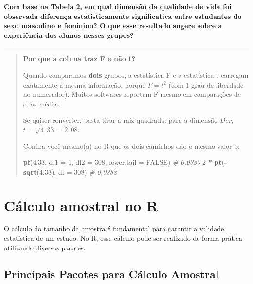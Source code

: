 \documentclass[
]{book}
\newenvironment{Shaded}{\begin{snugshade}}{\end{snugshade}}
\newcommand{\AttributeTok}[1]{\textcolor[rgb]{0.13,0.29,0.53}{#1}}
\newcommand{\CommentTok}[1]{\textcolor[rgb]{0.56,0.35,0.01}{\textit{#1}}}
\newcommand{\ConstantTok}[1]{\textcolor[rgb]{0.56,0.35,0.01}{#1}}
\newcommand{\DecValTok}[1]{\textcolor[rgb]{0.00,0.00,0.81}{#1}}
\newcommand{\FloatTok}[1]{\textcolor[rgb]{0.00,0.00,0.81}{#1}}
\newcommand{\FunctionTok}[1]{\textcolor[rgb]{0.13,0.29,0.53}{\textbf{#1}}}
\newcommand{\NormalTok}[1]{#1}
\newcommand{\SpecialCharTok}[1]{\textcolor[rgb]{0.81,0.36,0.00}{\textbf{#1}}}
\begin{document}
\textbf{Com base na Tabela 2, em qual dimensão da qualidade de vida foi observada diferença estatisticamente significativa entre estudantes do sexo masculino e feminino? O que esse resultado sugere sobre a experiência dos alunos nesses grupos?}

\begin{center}\rule{0.5\linewidth}{0.5pt}\end{center}

\begin{quote}
\textbf{Por que a coluna traz F e não t?}

Quando comparamos \textbf{dois} grupos, a estatística F e a estatística t carregam exatamente a mesma informação, porque \(F = t^2\) (com 1 grau de liberdade no numerador). Muitos softwares reportam F mesmo em comparações de duas médias.

Se quiser converter, basta tirar a raiz quadrada: para a dimensão \emph{Dor}, \(t = \sqrt{4{,}33} = 2{,}08\).

Confira você mesmo(a) no R que os dois caminhos dão o mesmo valor-p:

\begin{Shaded}
\begin{Highlighting}[]
\FunctionTok{pf}\NormalTok{(}\FloatTok{4.33}\NormalTok{, }\AttributeTok{df1 =} \DecValTok{1}\NormalTok{, }\AttributeTok{df2 =} \DecValTok{308}\NormalTok{, }\AttributeTok{lower.tail =} \ConstantTok{FALSE}\NormalTok{)   }\CommentTok{\# 0,0383}
\DecValTok{2} \SpecialCharTok{*} \FunctionTok{pt}\NormalTok{(}\SpecialCharTok{{-}}\FunctionTok{sqrt}\NormalTok{(}\FloatTok{4.33}\NormalTok{), }\AttributeTok{df =} \DecValTok{308}\NormalTok{)                      }\CommentTok{\# 0,0383}
\end{Highlighting}
\end{Shaded}
\end{quote}

\chapter{Cálculo amostral no R}\label{cuxe1lculo-amostral-no-r}

O cálculo do tamanho da amostra é fundamental para garantir a validade estatística de um estudo. No R, esse cálculo pode ser realizado de forma prática utilizando diversos pacotes.

\section{Principais Pacotes para Cálculo Amostral}\label{principais-pacotes-para-cuxe1lculo-amostral}
\end{document}
